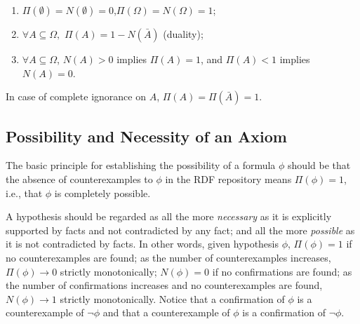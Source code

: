 \documentclass{sig-alternate}
\begin{document}
\begin{enumerate}
  \item $\Pi(\emptyset) = N(\emptyset) = 0$,\quad $\Pi(\Omega) = N(\Omega) = 1$;
  \item $\forall A\subseteq \Omega,$ $\Pi(A) = 1 - N(\bar{A})$ (duality);
  \item $\forall A\subseteq \Omega$, $N(A) > 0$ implies $\Pi(A) = 1$, and $\Pi(A) < 1$ implies $N(A) = 0$.
\end{enumerate}
In case of complete ignorance on $A$, $\Pi(A) = \Pi(\bar{A}) = 1$.


\subsection{Possibility and Necessity of an Axiom}

The basic principle for establishing the possibility of a formula $\phi$ should be
that the absence of counterexamples to $\phi$ in the RDF repository means $\Pi(\phi) = 1$,
i.e., that $\phi$ is completely possible.

A hypothesis should be regarded as all the more
\emph{necessary} as it is explicitly supported by facts and not contradicted by any fact;
and all the more \emph{possible} as it is not contradicted by facts.
In other words, given hypothesis $\phi$, $\Pi(\phi) = 1$ if no counterexamples are found; 
as the number of counterexamples increases, $\Pi(\phi) \to 0$ strictly monotonically;
$N(\phi) = 0$ if no confirmations are found; as the number of confirmations increases
and no counterexamples are found, $N(\phi) \to 1$ strictly monotonically.
Notice that a confirmation of $\phi$ is a counterexample of $\neg\phi$
and that a counterexample of $\phi$ is a confirmation of $\neg\phi$.
\end{document}
